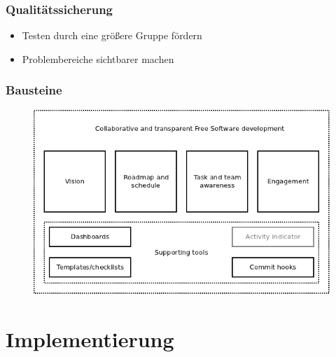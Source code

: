 \documentclass{beamer}
\begin{document}
\begin{frame}
\frametitle{Qualit\"atssicherung}
\begin{itemize}
 \item Testen durch eine gr\"o\ss ere Gruppe f\"ordern
 \item Problembereiche sichtbarer machen
\end{itemize}
\end{frame}

\begin{frame}
\frametitle{Bausteine}
\begin{figure}[h]
 \centering
 \includegraphics[scale=0.5,keepaspectratio=true]{./buildingblocks.png}
\end{figure}
\end{frame}

\section{Implementierung}
\end{document}
